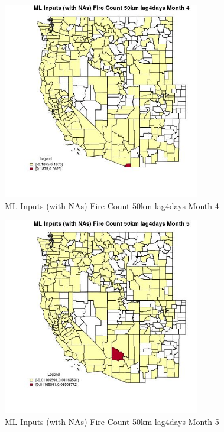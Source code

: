 \begin{figure} 
\centering  
\includegraphics[width=0.77\textwidth]{Code_Outputs/Report_ML_input_PM25_Step4_part_e_de_duplicated_aves_compiled_2019-05-20wNAs_CountyFire_Count_50km_lag4daysmedianMonth4.jpg} 
\caption{\label{fig:Report_ML_input_PM25_Step4_part_e_de_duplicated_aves_compiled_2019-05-20wNAsCountyFire_Count_50km_lag4daysmedianMonth4}ML Inputs (with NAs) Fire Count 50km lag4days Month 4} 
\end{figure} 
 

\begin{figure} 
\centering  
\includegraphics[width=0.77\textwidth]{Code_Outputs/Report_ML_input_PM25_Step4_part_e_de_duplicated_aves_compiled_2019-05-20wNAs_CountyFire_Count_50km_lag4daysmedianMonth5.jpg} 
\caption{\label{fig:Report_ML_input_PM25_Step4_part_e_de_duplicated_aves_compiled_2019-05-20wNAsCountyFire_Count_50km_lag4daysmedianMonth5}ML Inputs (with NAs) Fire Count 50km lag4days Month 5} 
\end{figure} 
 

